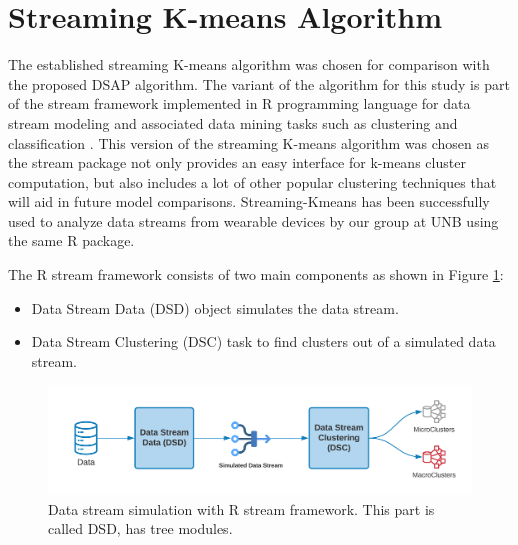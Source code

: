 \documentclass[../UNBThesis2.tex]{subfiles}
\begin{document}
\section{Streaming K-means Algorithm}
The established streaming K-means algorithm was chosen for comparison with the proposed DSAP algorithm. The variant of the algorithm for this study is part of the stream framework implemented in R programming language for data stream modeling and associated data mining tasks such as clustering and classification \cite{packager}. This version of the streaming K-means algorithm was chosen as the stream package not only provides an easy interface for k-means cluster computation, but also includes a lot of other popular clustering techniques that will aid in future model comparisons. Streaming-Kmeans has been successfully used to analyze data streams from wearable devices by our group at UNB using the same R package. 

The R stream framework consists of two main components as shown in Figure \ref{streammm}:
\begin{itemize}
    \item Data Stream Data (DSD) object simulates the data stream.
    \item Data Stream Clustering (DSC) task to find clusters out of a simulated data stream.
\end{itemize}

\begin{figure}[!h]
    \centering
    \includegraphics[width=.9\textwidth]{image/Chapters/Chapter5/RKmeans.png}
    \caption{ Data stream simulation with R stream framework. This part is called DSD, has tree modules.}
    \label{streammm}
\end{figure}




    
\end{document}
